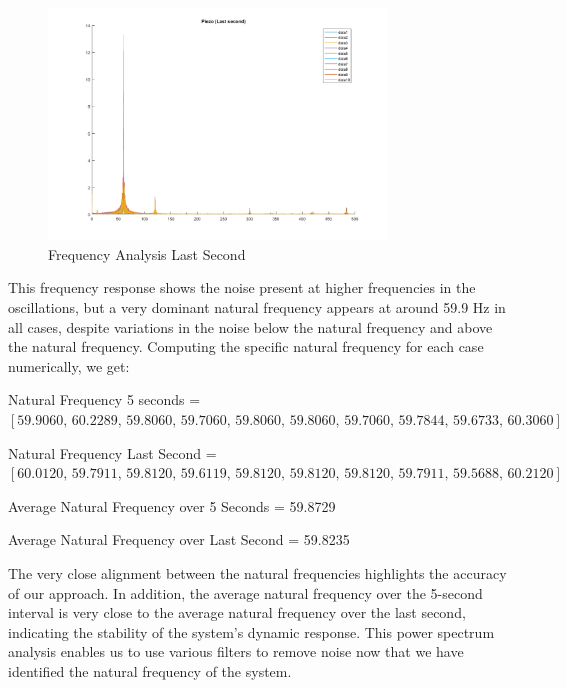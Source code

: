 \documentclass{article}
\begin{document}
\begin{figure}[H]
    \centering
    \includegraphics[width = 0.8\textwidth]{lab6images/frequencyanalysislastsecond.png}
    \caption{Frequency Analysis Last Second}
    \label{fig:freqresponselast}
\end{figure}

This frequency response shows the noise present at higher frequencies in the oscillations, but a very dominant natural frequency appears at around 59.9 Hz in all cases, despite variations in the noise below the natural frequency and above the natural frequency. Computing the specific natural frequency for each case numerically, we get:

Natural Frequency 5 seconds = \\
\(\left[59.9060,\,   60.2289,\,   59.8060,\,   59.7060,\,  59.8060,\,   59.8060,\,   59.7060,\,   59.7844,\,   59.6733,\,   60.3060\right]\)

Natural Frequency Last Second = \\
\(\left[60.0120,\,   59.7911,\,   59.8120,\,   59.6119,\,  59.8120,\,   59.8120,\,   59.8120,\,   59.7911,\,   59.5688,\,   60.2120\right]\)

Average Natural Frequency over 5 Seconds = 59.8729  %

Average Natural Frequency over Last Second = 59.8235  %

The very close alignment between the natural frequencies highlights the accuracy of our approach. In addition, the average natural frequency over the 5-second interval is very close to the average natural frequency over the last second, indicating the stability of the system's dynamic response. This power spectrum analysis enables us to use various filters to remove noise now that we have identified the natural frequency of the system.
\end{document}
